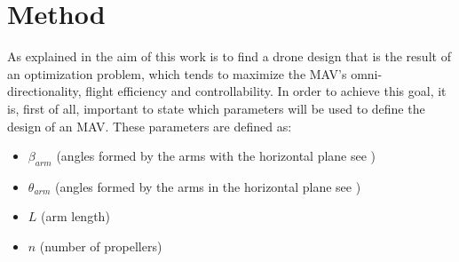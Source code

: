 \chapter{Method}
\label{sec:method}
As explained in  the aim of this work is to find a drone
design that is the result of an optimization problem, which tends to maximize the
MAV's omni-directionality, flight efficiency and controllability. In order to achieve
this goal, it is, first of all, important to state which parameters will be used to
define the design of an MAV. These parameters are defined as:

\begin{itemize}
\item $\beta_{arm}$  (angles formed by the arms with the horizontal plane see )
\item $\theta_{arm}$ (angles formed by the arms in the horizontal plane see )
\item $L$ (arm length)
\item $n$ (number of propellers)
\end{itemize}
